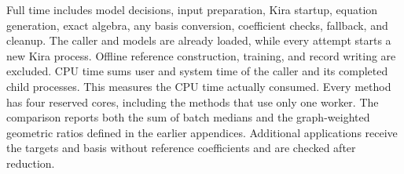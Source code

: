 Full time includes model decisions, input preparation, Kira startup,
equation generation, exact algebra, any basis conversion, coefficient
checks, fallback, and cleanup. The caller and models are already loaded,
while every attempt starts a new Kira process. Offline reference
construction, training, and record writing are excluded. CPU time sums
user and system time of the caller and its completed child processes.
This measures the CPU time actually consumed. Every method has four reserved cores, including the methods that use only one worker. The comparison reports both the sum of batch medians and
the graph-weighted geometric ratios defined in the earlier appendices.
Additional applications receive the targets and basis without reference
coefficients and are checked after reduction.
